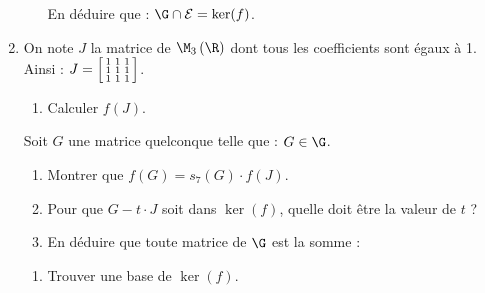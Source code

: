 \documentclass[12pt]{article}
\newcommand\Esp{\mathcal{E}}
\begin{document}
\begin{enumerate}[resume]
\begin{enumerate}[resume]
      En déduire que : \quad \(\G\cap\Esp=\ker(f)\).
  \end{enumerate}
  \item 
On note \(J\) la matrice de \(\M_{3}\left( \R\right) \) dont tous les coefficients sont égaux à 1. 
    \hfiller
    \hint
    {
      Ainsi : \quad
      \smash
      {%
        $J = 
        \begin{bsmallmatrix}
          1 & 1 & 1 \\
          1 & 1 & 1 \\
          1 & 1 & 1 \\
        \end{bsmallmatrix}
        $.%
      }%
    }
  \begin{enumerate}
    \item Calculer $f(J)$.
  \end{enumerate}
    Soit $G$ une matrice quelconque telle que : \quad $G \in \G$.
  \begin{enumerate}[resume]
    \item Montrer que $f(G) = s_7(G) \cdot f(J)$.
    \item Pour que $G - t \cdot J$ soit dans $\ker(f)$, quelle doit être la valeur de $t$ ?
    \item En déduire que toute matrice de \(\G\) est la somme : \quad
      \moinsLigne[2]
  \end{enumerate}
  \begin{enumerate}[resume]
    \item Trouver une base de \(\ker(f)\).
  \end{enumerate}
\end{enumerate}
\end{document}
